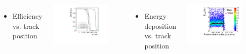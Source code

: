 \begin{frame}
  \begin{columns}[t]
    
    \begin{itemize}
    \item Efficiency vs. track position
    \end{itemize}
    \centering
    \includegraphics[width=0.8\textwidth, page=3]{../figures/TestBeam/edge_bcp.pdf}
    
    \begin{itemize}
    \item Energy deposition vs. track position
    \end{itemize}
    \centering
    \includegraphics[width=0.8\textwidth]{../figures/ActiveEdge/20_NGR_Edep_TCAD_data.pdf}

  \end{columns}

\end{frame}
